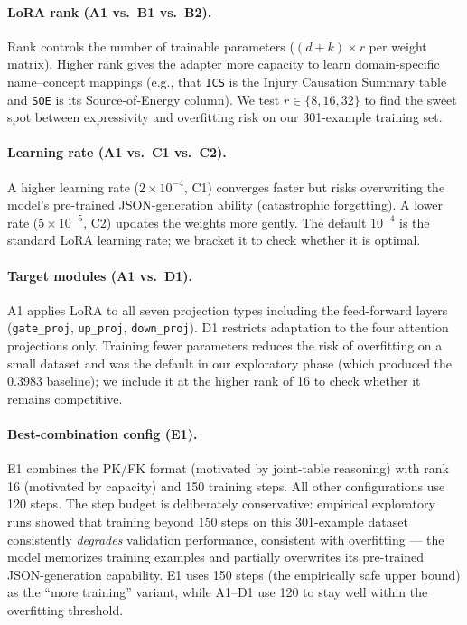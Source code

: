 \documentclass[11pt,letterpaper]{article}
\begin{document}
\paragraph{LoRA rank (A1 vs.\ B1 vs.\ B2).}
Rank controls the number of trainable parameters
($(d+k)\times r$ per weight matrix).
Higher rank gives the adapter more capacity to learn domain-specific
name--concept mappings (e.g., that \texttt{ICS} is the Injury Causation
Summary table and \texttt{SOE} is its Source-of-Energy column).
We test $r\in\{8,16,32\}$ to find the sweet spot between expressivity and
overfitting risk on our 301-example training set.

\paragraph{Learning rate (A1 vs.\ C1 vs.\ C2).}
A higher learning rate ($2\times10^{-4}$, C1) converges faster but risks
overwriting the model's pre-trained JSON-generation ability (catastrophic
forgetting).
A lower rate ($5\times10^{-5}$, C2) updates the weights more gently.
The default $10^{-4}$ is the standard LoRA learning rate; we bracket it to
check whether it is optimal.

\paragraph{Target modules (A1 vs.\ D1).}
A1 applies LoRA to all seven projection types including the feed-forward
layers (\texttt{gate\_proj}, \texttt{up\_proj}, \texttt{down\_proj}).
D1 restricts adaptation to the four attention projections only.
Training fewer parameters reduces the risk of overfitting on a small dataset
and was the default in our exploratory phase (which produced the 0.3983
baseline); we include it at the higher rank of 16 to check whether it
remains competitive.

\paragraph{Best-combination config (E1).}
E1 combines the PK/FK format (motivated by joint-table reasoning) with rank 16
(motivated by capacity) and 150 training steps.
All other configurations use 120 steps.
The step budget is deliberately conservative: empirical exploratory runs
showed that training beyond 150 steps on this 301-example dataset consistently
\emph{degrades} validation performance, consistent with overfitting --- the
model memorizes training examples and partially overwrites its pre-trained
JSON-generation capability.
E1 uses 150 steps (the empirically safe upper bound) as the ``more training''
variant, while A1--D1 use 120 to stay well within the overfitting threshold.
\end{document}
